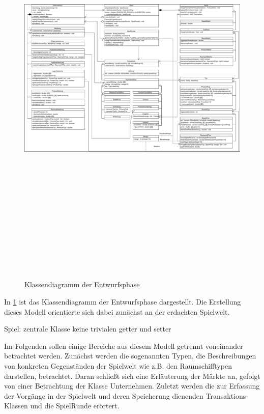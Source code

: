 \begin{figure}[p]

\caption{Klassendiagramm der Entwurfsphase}
\setlength\fboxrule{0pt}
\includegraphics[angle=90, height=20cm]{30_Fachkonzept/20_Entwurf/gesamtmodell}
\label{img:fachkonzept-entwurf-klassendiagramm}
\end{figure}

In \ref{img:fachkonzept-entwurf-klassendiagramm} ist das Klassendiagramm der Entwurfsphase dargestellt. Die Erstellung dieses Modell orientierte sich dabei zunächst an der erdachten Spielwelt. 

Spiel: zentrale Klasse
keine trivialen getter und setter

Im Folgenden sollen einige Bereiche aus diesem Modell getrennt voneinander betrachtet werden. Zunächst werden die sogenannten Typen, die Beschreibungen von konkreten Gegenständen der Spielwelt wie z.B. den Raumschifftypen darstellen, betrachtet. Daran schließt sich eine Erläuterung der Märkte an, gefolgt von einer Betrachtung der Klasse Unternehmen. Zuletzt werden die zur Erfassung der Vorgänge in der Spielwelt und deren Speicherung dienenden Transaktions-Klassen und die SpielRunde erörtert.

